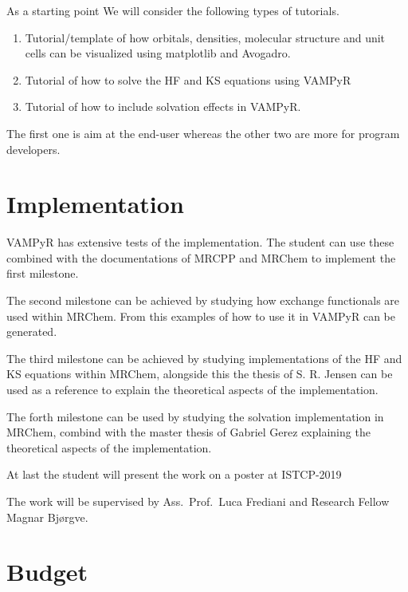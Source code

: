 \documentclass[12pt]{article}
\begin{document}
As a starting point We will consider the following types of tutorials.

\begin{enumerate}
    \item Tutorial/template of how orbitals, densities, molecular structure and unit cells
    can be visualized using matplotlib and Avogadro.
    \item Tutorial of how to solve the \ac{HF} and \ac{KS} equations using \ac{VAMPyR}
    \item Tutorial of how to include solvation effects in \ac{VAMPyR}.
\end{enumerate}

The first one is aim at the end-user whereas the other two are more
for program developers.

\section{Implementation}

VAMPyR has extensive tests of the implementation. The student can use these
combined with the documentations of \ac{MRCPP} and \ac{MRChem} to implement
the first milestone.

The second milestone can be achieved by studying how exchange functionals
are used within \ac{MRChem}. From this examples of how to use it in VAMPyR
can be generated.

The third milestone can be achieved by studying implementations of the
\ac{HF} and \ac{KS} equations within \ac{MRChem}, alongside this the
thesis of S. R. Jensen can be used as a reference to explain the
theoretical aspects of the implementation.

The forth milestone can be used by studying the solvation implementation
in \ac{MRChem}, combind with the master thesis of Gabriel Gerez explaining
the theoretical aspects of the implementation.

At last the student will present the work on a poster at ISTCP-2019

The work will be supervised by Ass.~Prof.~Luca Frediani and Research Fellow
Magnar Bj\o rgve.

\section{Budget}





\end{document}
